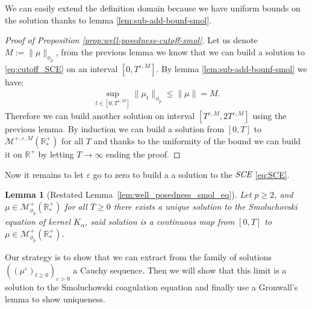 \documentclass[11pt,a4paper]{article}
\newcommand{\RR}{\mathbb{R}}
\newcommand{\RRP}{\mathbb{R}^+_*}
\newcommand{\MC}{\mathcal{M}}
\newcommand{\SCE}{\emph{SCE}}
\newcommand{\Proc}[1]{\left(#1\right)_{t\geq 0}}
\newtheorem{lemma}[theorem]{Lemma}
\begin{document}
We can easily extend the definition domain because we have uniform bounds on the solution thanks to lemma \ref{lem:sub-add-bounf-smol}.
\begin{proof}[Proof of Proposition \ref{prop:well-posedness-cutoff-smol}]
    Let us denote $M:= \|\mu\|_{\phi_p}$, from the previous lemma we know that we can build a solution to \eqref{eq:cutoff_SCE} on an interval $\left[0,T^{\varepsilon,M}\right]$. By lemma \ref{lem:sub-add-bounf-smol} we have:
    \begin{align*}
        \sup\limits_{t \in \left[0,T^{\varepsilon,M}\right]} \|\mu_t\|_{\phi_p} \leq \|\mu\| = M.
    \end{align*}
    Therefore we can build another solution on interval $\left[T^{\varepsilon,M}, 2T^{\varepsilon,M}\right]$ using the previous lemma. By induction we can build a solution from $[0,T]$ to $\MC^{+,\varepsilon,M}\left(\RRP\right)$ for all $T$ and thanks to the uniformity of the bound we can build it on $\RR^{+}$ by letting $T \to \infty$ ending the proof.
\end{proof}
Now it remains to let $\varepsilon$ go to zero to build a a solution to the $\SCE$ \eqref{eq:SCE}. 
\begin{lemma}[Restated Lemma~\ref{lem:well_posedness_smol_eq}]
    Let $p \geq 2$, and $\mu \in \MC_{\phi_p}^+ (\RRP)$ for all $T \geq 0$ there exists a unique solution to the Smoluchovski equation of kernel $K_\alpha$, said solution is a continuous map from $[0,T]$ to $\mu \in \MC_{\phi_p}^+ (\RRP)$.
\end{lemma}
Our strategy is to show that we can extract from the family of solutions $\left(\Proc{\mu^\varepsilon}\right)_{\varepsilon > 0}$ a Cauchy sequence. Then we will show that this limit is a solution to the Smoluchowski coagulation equation and finally use a Gronwall's lemma to show uniqueness. 
\end{document}
